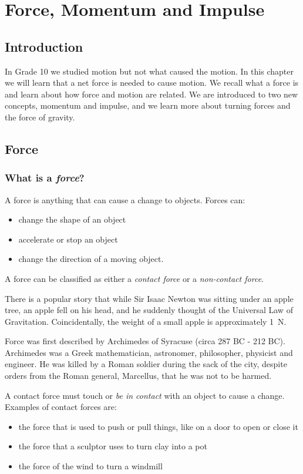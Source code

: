 \chapter{Force, Momentum and Impulse}
\label{p:m:fmi11}



\section{Introduction}
In Grade 10 we studied motion but not what caused the motion. In this chapter we will learn that a net force is needed to cause motion. We recall what a force is and learn about how force and motion are related. We are introduced to two new concepts, momentum and impulse, and we learn more about turning forces and the force of gravity.\\
\section{Force}

\subsection{What is a \textit{force}?}
A force is anything that can cause a change to objects. Forces can:
\begin{itemize}
\item change the shape of an object
\item accelerate or stop an object
\item change the direction of a moving object.
\end{itemize}

A force can be classified as either a \textit{contact force} or a \textit{non-contact force}.

\begin{IFact}{There is a popular story that while Sir Isaac Newton was sitting under an apple tree, an apple fell on his head, and he suddenly thought of the Universal Law of Gravitation. Coincidentally, the weight of a small apple is approximately 1~N.}\end{IFact}

\begin{IFact}{Force was first described by Archimedes of Syracuse (circa 287 BC - 212 BC). Archimedes was a Greek mathematician, astronomer, philosopher, physicist and engineer. He was killed by a Roman soldier during the sack of the city, despite orders from the Roman general, Marcellus, that he was not to be harmed.}
\end{IFact}
A contact force must touch or \textit{be in contact} with an object to cause a change. Examples of contact forces are:
\begin{itemize}
\item the force that is used to push or pull things, like on a door to open or close it
\item the force that a sculptor uses to turn clay into a pot
\item the force of the wind to turn a windmill
\end{itemize}

